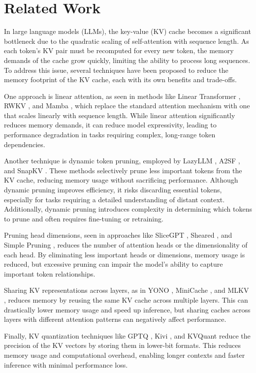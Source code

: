 \section{Related Work}
In large language models (LLMs), the key-value (KV) cache becomes a significant bottleneck due to the quadratic scaling of self-attention with sequence length. As each token's KV pair must be recomputed for every new token, the memory demands of the cache grow quickly, limiting the ability to process long sequences. To address this issue, several techniques have been proposed to reduce the memory footprint of the KV cache, each with its own benefits and trade-offs.

One approach is linear attention, as seen in methods like Linear Transformer \cite{katharopoulos2020transformers,wang2020linformer}, RWKV \cite{peng2023rwkv}, and Mamba \cite{gu2023mamba}, which replace the standard attention mechanism with one that scales linearly with sequence length. While linear attention significantly reduces memory demands, it can reduce model expressivity, leading to performance degradation in tasks requiring complex, long-range token dependencies.

Another technique is dynamic token pruning, employed by LazyLLM \cite{fu2024lazyllm}, A2SF \cite{jo2024a2sf}, and SnapKV \cite{li2024snapkv}. These methods selectively prune less important tokens from the KV cache, reducing memory usage without sacrificing performance. Although dynamic pruning improves efficiency, it risks discarding essential tokens, especially for tasks requiring a detailed understanding of distant context. Additionally, dynamic pruning introduces complexity in determining which tokens to prune and often requires fine-tuning or retraining.

Pruning head dimensions, seen in approaches like SliceGPT \cite{ashkboos2024slicegpt}, Sheared \cite{xia2023sheared}, and Simple Pruning \cite{sun2023simple}, reduces the number of attention heads or the dimensionality of each head. By eliminating less important heads or dimensions, memory usage is reduced, but excessive pruning can impair the model’s ability to capture important token relationships. 

Sharing KV representations across layers, as in YONO \cite{sun2024you}, MiniCache \cite{liu2024minicache}, and MLKV \cite{zuhri2024mlkv}, reduces memory by reusing the same KV cache across multiple layers. This can drastically lower memory usage and speed up inference, but sharing caches across layers with different attention patterns can negatively affect performance.

Finally, KV quantization techniques like GPTQ \cite{frantar2022gptq}, Kivi \cite{liu2024kivi}, and KVQuant \cite{hooper2024kvquant} reduce the precision of the KV vectors by storing them in lower-bit formats. This reduces memory usage and computational overhead, enabling longer contexts and faster inference with minimal performance loss. 

\newpage